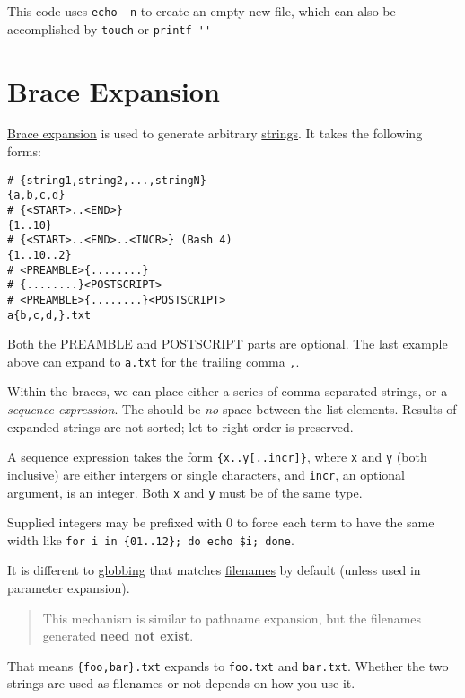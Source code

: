 This code uses \lstinline|echo -n| to create an empty new
file, which can also be accomplished by \lstinline|touch| or
\lstinline|printf ''|

\section{Brace Expansion}
\label{sec:brace-expansion}

\href{https://wiki.bash-hackers.org/syntax/expansion/brace}{Brace
  expansion} is used to generate arbitrary \uline{strings}. It
takes the following forms:

\begin{lstlisting}
# {string1,string2,...,stringN}
{a,b,c,d}
# {<START>..<END>}
{1..10}
# {<START>..<END>..<INCR>} (Bash 4)
{1..10..2}
# <PREAMBLE>{........}
# {........}<POSTSCRIPT>
# <PREAMBLE>{........}<POSTSCRIPT>
a{b,c,d,}.txt
\end{lstlisting}

Both the PREAMBLE and POSTSCRIPT parts are optional. The last
example above can expand to \verb|a.txt| for the trailing
comma \lstinline|,|.

Within the braces, we can place either a series of comma-separated
strings, or a \textit{sequence expression}. The should be
\textit{no} space between the list elements. Results of expanded
strings are not sorted; let to right order is preserved.

A sequence expression takes the form \lstinline|{x..y[..incr]}|,
where \lstinline|x| and \lstinline|y| (both inclusive) are either
intergers or single characters, and \lstinline|incr|, an optional
argument, is an integer. Both \lstinline|x| and \lstinline|y| must
be of the same type.

Supplied integers may be prefixed with 0 to force each term to
have the same width like
\lstinline|for i in {01..12}; do echo $i; done|.

It is different to
\href{https://www.gnu.org/software/bash/manual/bash.html#Filename-Expansion}{globbing}
that matches \uline{filenames} by default (unless used in
parameter expansion).

\begin{quotation}
  This mechanism is similar to pathname expansion, but the filenames generated \textbf{need not exist}.
\end{quotation}

That means \lstinline|{foo,bar}.txt| expands to
\lstinline|foo.txt| and \lstinline|bar.txt|. Whether the two
strings are used as filenames or not depends on how you use it.

